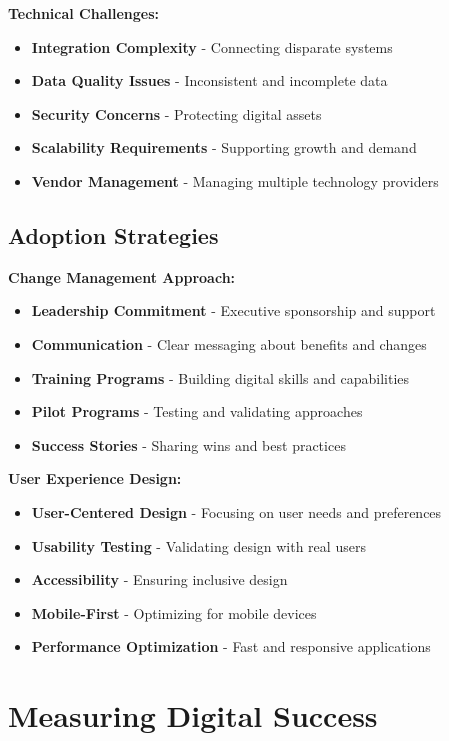 \documentclass[12pt]{article}
\begin{document}
\textbf{Technical Challenges:}
\begin{itemize}
    \item \textbf{Integration Complexity} - Connecting disparate systems
    \item \textbf{Data Quality Issues} - Inconsistent and incomplete data
    \item \textbf{Security Concerns} - Protecting digital assets
    \item \textbf{Scalability Requirements} - Supporting growth and demand
    \item \textbf{Vendor Management} - Managing multiple technology providers
\end{itemize}

\subsection{Adoption Strategies}

\textbf{Change Management Approach:}
\begin{itemize}
    \item \textbf{Leadership Commitment} - Executive sponsorship and support
    \item \textbf{Communication} - Clear messaging about benefits and changes
    \item \textbf{Training Programs} - Building digital skills and capabilities
    \item \textbf{Pilot Programs} - Testing and validating approaches
    \item \textbf{Success Stories} - Sharing wins and best practices
\end{itemize}

\textbf{User Experience Design:}
\begin{itemize}
    \item \textbf{User-Centered Design} - Focusing on user needs and preferences
    \item \textbf{Usability Testing} - Validating design with real users
    \item \textbf{Accessibility} - Ensuring inclusive design
    \item \textbf{Mobile-First} - Optimizing for mobile devices
    \item \textbf{Performance Optimization} - Fast and responsive applications
\end{itemize}

\section{Measuring Digital Success}
\end{document}
